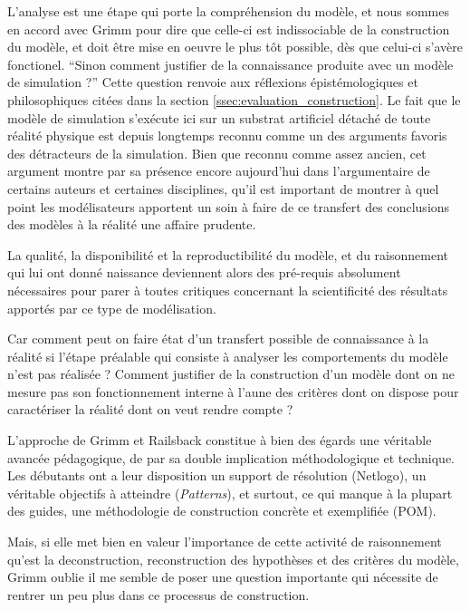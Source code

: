 L'analyse est une étape qui porte la compréhension du modèle, et nous sommes en accord avec Grimm pour dire que celle-ci est indissociable de la construction du modèle, et doit être mise en oeuvre le plus tôt possible, dès que celui-ci s'avère fonctionel. \enquote{Sinon comment justifier de la connaissance produite avec un modèle de simulation ?} Cette question renvoie aux réflexions épistémologiques et philosophiques citées dans la section \ref{ssec:evaluation_construction}. Le fait que le modèle de simulation s'exécute ici sur un substrat artificiel détaché de toute réalité physique est depuis longtemps reconnu comme un des arguments favoris des détracteurs de la simulation. Bien que reconnu comme assez ancien, cet argument montre par sa présence encore aujourd'hui dans l'argumentaire de certains auteurs et certaines disciplines, qu'il est important de montrer à quel point les modélisateurs apportent un soin à faire de ce transfert des conclusions des modèles à la réalité une affaire prudente. %

La qualité, la disponibilité et la reproductibilité du modèle, et du raisonnement qui lui ont donné naissance deviennent alors des pré-requis absolument nécessaires pour parer à toutes critiques concernant la scientificité des résultats apportés par ce type de modélisation. %

Car comment peut on faire état d'un transfert possible de connaissance à la réalité si l'étape préalable qui consiste à analyser les comportements du modèle n'est pas réalisée ? Comment justifier de la construction d'un modèle dont on ne mesure pas son fonctionnement interne à l'aune des critères dont on dispose pour caractériser la réalité dont on veut rendre compte ?

L'approche de Grimm et Railsback constitue à bien des égards une véritable avancée pédagogique, de par sa double implication méthodologique et technique. Les débutants ont a leur disposition un support de résolution (Netlogo), un véritable objectifs à atteindre (\textit{Patterns}), et surtout, ce qui manque à la plupart des guides, une méthodologie de construction concrète et exemplifiée (POM).

Mais, si elle met bien en valeur l'importance de cette activité de raisonnement qu'est la deconstruction, reconstruction des hypothèses et des critères du modèle, Grimm oublie il me semble de poser une question importante qui nécessite de rentrer un peu plus dans ce processus de construction. %

